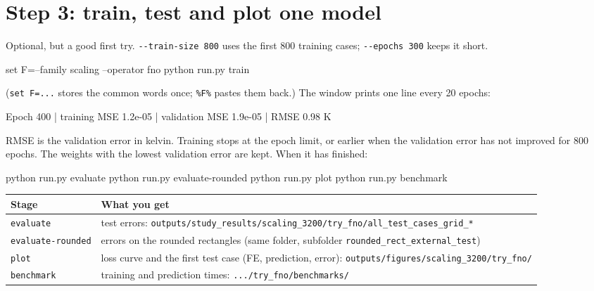 \documentclass[11pt,a4paper]{article}
\newcommand{\code}[1]{\lstinline{#1}}
\begin{document}
\section{Step 3: train, test and plot one model}\label{sec:pcone}

Optional, but a good first try. \code{--train-size 800} uses the first 800 training cases;
\code{--epochs 300} keeps it short.

\begin{cmd}
set F=--family scaling --operator fno
python run.py train %
\end{cmd}

(\code{set F=...} stores the common words once; \texttt{\%F\%} pastes them back.)
The window prints one line every 20 epochs:

\begin{cmd}
Epoch   400 | training MSE 1.2e-05 | validation MSE 1.9e-05 | RMSE 0.98 K
\end{cmd}

RMSE is the validation error in kelvin. Training stops at the epoch limit, or earlier when the
validation error has not improved for 800 epochs. The weights with the lowest validation error
are kept. When it has finished:

\begin{cmd}
python run.py evaluate         %
python run.py evaluate-rounded %
python run.py plot             %
python run.py benchmark        %
\end{cmd}

\begin{center}
\begin{tabularx}{\textwidth}{@{}lY@{}}
\toprule
Stage & What you get \\
\midrule
\code{evaluate}         & test errors: \code{outputs/study_results/scaling_3200/try_fno/all_test_cases_grid_*} \\
\code{evaluate-rounded} & errors on the rounded rectangles (same folder, subfolder \code{rounded_rect_external_test}) \\
\code{plot}             & loss curve and the first test case (FE, prediction, error):
                          \code{outputs/figures/scaling_3200/try_fno/} \\
\code{benchmark}        & training and prediction times: \code{.../try_fno/benchmarks/} \\
\bottomrule
\end{tabularx}
\end{center}
\end{document}
